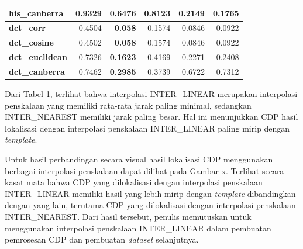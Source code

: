 \begin{table}[!ht]
{\begin{tabular}{|l|r|r|r|r|r|}
			\textbf{his\_canberra}  & 0.9329                                       & 0.6476                                      & 0.8123                                    & 0.2149                                     & \textbf{0.1765}                               \\ \hline
			\textbf{dct\_corr}      & 0.4504                                       & \textbf{0.058}                              & 0.1574                                    & 0.0846                                     & 0.0922                                        \\ \hline
			\textbf{dct\_cosine}    & 0.4502                                       & \textbf{0.058}                              & 0.1574                                    & 0.0846                                     & 0.0922                                        \\ \hline
			\textbf{dct\_euclidean} & 0.7326                                       & \textbf{0.1623}                             & 0.4169                                    & 0.2271                                     & 0.2408                                        \\ \hline
			\textbf{dct\_canberra}  & 0.7462                                       & \textbf{0.2985}                             & 0.3739                                    & 0.6722                                     & 0.7312                                        \\ \hline
		\end{tabular}}
	\label{Tab: 4-jarakorisinalberbagaiinterpolasi}
\end{table}

\noindent Dari Tabel \ref{Tab: 4-jarakorisinalberbagaiinterpolasi}, terlihat bahwa interpolasi INTER\_LINEAR merupakan interpolasi penskalaan yang memiliki rata-rata jarak paling minimal, sedangkan INTER\_NEAREST memiliki jarak paling besar. Hal ini menunjukkan CDP hasil lokalisasi dengan interpolasi penskalaan INTER\_LINEAR paling mirip dengan \emph{template}.

Untuk hasil perbandingan secara visual hasil lokalisasi CDP menggunakan berbagai interpolasi penskalaan dapat dilihat pada Gambar x. Terlihat secara kasat mata
bahwa CDP yang dilokalisasi dengan interpolasi penskalaan INTER\_LINEAR memiliki hasil yang lebih mirip dengan \emph{template} dibandingkan dengan yang lain,
terutama CDP yang dilokalisasi dengan interpolasi penskalaan INTER\_NEAREST. Dari hasil tersebut, penulis memutuskan untuk menggunakan interpolasi penskalaan
INTER\_LINEAR dalam pembuatan pemrosesan CDP dan pembuatan \emph{dataset} selanjutnya.

